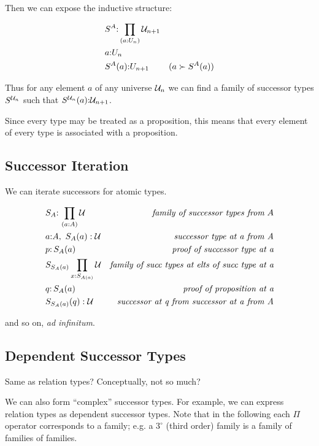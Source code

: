 \documentclass{article}
\begin{document}
Then we can expose the inductive structure:

\begin{align}
  & S^A{:}\prod\limits_{(a:U_{n})}\mathcal{U}_{n+1} \\
  & a{:}U_{n} \\
  & S^A(a){:}U_{n+1} & (a\succ S^A(a))
\end{align}

Thus for any element \(a\) of any universe \(\mathcal{U}_n\) we can find a
family of successor types \(S^{\mathcal{U}_n}\) such that
\(S^{\mathcal{U}_n}(a){:}\mathcal{U}_{n+1}\).

Since every type may be treated as a proposition, this means that
every element of every type is associated with a proposition.

\subsection{Successor Iteration}

We can iterate successors for atomic types.

\begin{align}
  & S_A{:}\,\prod\limits_{(a:A)}\mathcal{U} & \textit{family of successor types from}\ A \\
  & a{:}A,\ S_A(a):\mathcal{U} & \textit{successor type at a from A} \\
  & p{:}\,S_A(a) & \textit{proof of successor type at a} \\
  & S_{S_A(a)}\prod\limits_{x{:}S_{A(a)}}\mathcal{U} & \textit{family of succ types at elts of succ type at a} \\
  & q{:}\,S_A(a) & \textit{proof of proposition at a} \\
  & S_{S_A(a)}(q):\mathcal{U} & \textit{successor at q from successor at a from A}
\end{align}

and so on, \emph{ad infinitum}.


\subsection{Dependent Successor Types}

Same as relation types?  Conceptually, not so much?

We can also form ``complex'' successor types.  For example, we can
express relation types as dependent successor types.  Note that in the
following each \(\Pi\) operator corresponds to a family; e.g. a
\(3^{\circ}\) (third order) family is a family of families of families.
\end{document}
